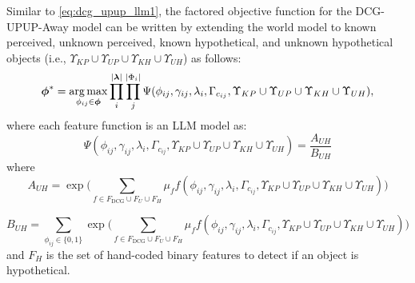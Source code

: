 Similar to \eqref{eq:dcg_upup_llm1}, the factored objective function for the DCG-UPUP-Away model can be written by extending the world model to known perceived, unknown perceived, known hypothetical, and unknown hypothetical objects  (i.e., $\Upsilon_{KP} \cup \Upsilon_{UP} \cup \Upsilon_{KH} \cup \Upsilon_{UH}$) as follows:
\begin{equation}
\boldsymbol{\phi}^* = \operatorname*{\arg\max}_{\phi_{ij} \in \boldsymbol{\phi}} \prod_{i}^{|\boldsymbol\lambda|} \prod_j^{|\Phi_i|} \Psi(\phi_{ij},\gamma_{ij},\lambda_i,\Gamma_{c_{ij}},\Upsilon_{KP} \cup \Upsilon_{UP} \cup \Upsilon_{KH} \cup \Upsilon_{UH}),
\label{eq:dcg_upup_away_llm1}
\end{equation}
where each feature function is an LLM model as:
\begin{equation}
\Psi(\phi_{ij},\gamma_{ij},\lambda_i,\Gamma_{c_{ij}},\Upsilon_{KP} \cup \Upsilon_{UP} \cup \Upsilon_{KH} \cup \Upsilon_{UH}) = \frac{A_{UH}}{B_{UH}}
\end{equation}
where
\begin{equation}
A_{UH}=\exp \Big( \sum_{f \in F_{\text{DCG}} \cup F_{U} \cup F_{H}} \mu_f f(\phi_{ij},\gamma_{ij},\lambda_i,\Gamma_{c_{ij}},\Upsilon_{KP} \cup \Upsilon_{UP} \cup \Upsilon_{KH} \cup \Upsilon_{UH}) \Big) \nonumber
\end{equation}

\begin{equation}
B_{UH}=\sum_{\phi_{ij} \in \{0,1\}}\exp \Big( \sum_{f \in F_{\text{DCG}} \cup F_{U} \cup F_{H}} \mu_f f(\phi_{ij},\gamma_{ij},\lambda_i,\Gamma_{c_{ij}},\Upsilon_{KP} \cup \Upsilon_{UP} \cup \Upsilon_{KH} \cup \Upsilon_{UH}) \Big) \nonumber
\end{equation}
and $F_H$ is the set of hand-coded binary features to detect if an object is hypothetical. 





